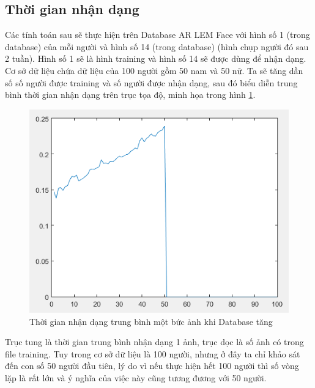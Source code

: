 \documentclass[conference]{IEEEtran}
\begin{document}
\subsection{Thời gian nhận dạng}
Các tính toán sau sẽ thực hiện trên Database AR LEM Face với hình số 1 (trong database) của mỗi người và hình số 14 (trong database) (hình chụp người đó sau 2 tuần). Hình số 1 sẽ là hình training và hình số 14 sẽ được dùng để nhận dạng. Cơ sở dữ liệu chứa dữ liệu của 100 người gồm 50 nam và 50 nữ. Ta sẽ tăng dần số số người được training và số người được nhận dạng, sau đó biểu diễn trung bình thời gian nhận dạng trên trục tọa độ, minh họa trong hình \ref{fig:bieudo1_tinh}.
\begin{figure}
  \includegraphics[width=\linewidth]{bieudo1_tinh}
  \caption{Thời gian nhận dạng trung bình một bức ảnh khi Database tăng}
  \label{fig:bieudo1_tinh}
\end{figure} 

Trục tung là thời gian trung bình nhận dạng 1 ảnh, trục dọc là số ảnh có trong file training. Tuy trong cơ sở dữ liệu là 100 người, nhưng ở đây ta chỉ khảo sát đến con số 50 người đầu tiên, lý do vì nếu thực hiện hết 100 người thì số vòng lặp là rất lớn và ý nghĩa của việc này cũng tương đương với 50 người.
\end{document}

